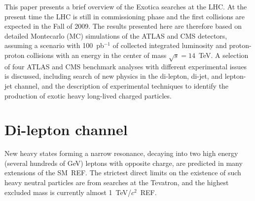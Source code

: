 \documentclass{cimento}
\begin{document}
This paper presents a brief overview of the Exotica searches at the LHC. 
At the present time the LHC is still in commissioning phase 
and the first collisions are expected in the Fall of 2009.
The results presented here are therefore based on detailed 
Montecarlo (MC) simulations of the ATLAS and CMS detectors, 
assuming a scenario with 100~pb$^{-1}$ of collected integrated luminosity 
and proton-proton collisions with an energy in the center 
of mass $\sqrt{s} = 14$~TeV. 
A selection of four ATLAS and CMS benchmark analyses with different 
experimental issues is discussed, including 
search of new physics in the di-lepton, di-jet, and lepton-jet
channel, and the description of experimental techniques to identify the production of 
exotic heavy long-lived charged particles.


\section{Di-lepton channel} \label{dilepton}

New heavy states forming a narrow resonance, decaying 
into two high energy (several hundreds of GeV) 
leptons with opposite charge, are predicted in  
many extensions of the SM~REF.
The strictest direct limits on the existence of such 
heavy neutral particles are from searches at the Tevatron, and 
the highest excluded mass is currently almost 1~TeV/$c^2$~REF.
\end{document}
